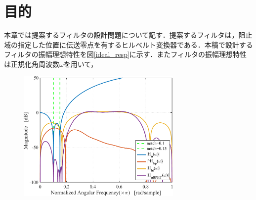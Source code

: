 \section{目的}
本章では提案するフィルタの設計問題について記す．提案するフィルタは，阻止域の指定した位置に伝送零点を有するヒルベルト変換器である．本稿で設計するフィルタの振幅理想特性を図\ref{ideal_resp}に示す．またフィルタの振幅理想特性は正規化角周波数$\omega$を用いて，

\begin{figure}[tb]
    \centering
    \includegraphics[width=8cm]
    		{Figure/figure01.pdf}
    \caption{}
    \label{fig:man}
\end{figure}